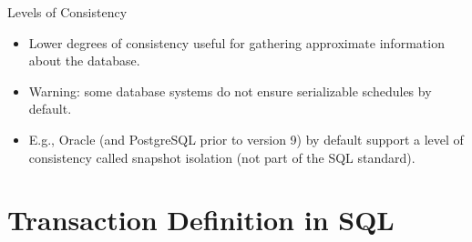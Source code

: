 \documentclass{beamer}
\begin{document}
\begin{frame}{Levels of Consistency}

    \begin{itemize}
        \item Lower degrees of consistency useful for gathering approximate information about the database.
        \item Warning: some database systems do not ensure serializable schedules by default.
        \item E.g., Oracle (and PostgreSQL prior to version 9) by default support a level of consistency called snapshot isolation (not part of the SQL standard).
    \end{itemize}

\end{frame}

\section{Transaction Definition in SQL}

\end{document}
